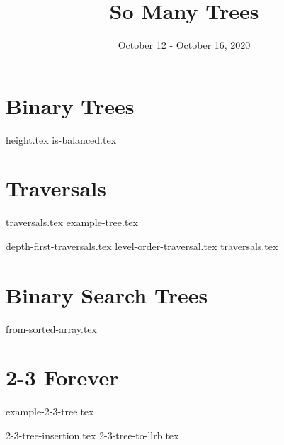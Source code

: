 \documentclass[11pt]{exam}
\title{So Many Trees}
\date{October 12 - October 16, 2020}
\begin{document}
\maketitle

\section{Binary Trees}
\begin{questions}
{height.tex}
{is-balanced.tex}
\end{questions}
\clearpage

\section{Traversals}
{traversals.tex}
{example-tree.tex}
\begin{questions}
{depth-first-traversals.tex}
{level-order-traversal.tex}
\enlargethispage{2in}
{traversals.tex}
\end{questions}
\clearpage

\section{Binary Search Trees}
\begin{questions}
{from-sorted-array.tex}
\end{questions}
\clearpage

\section{2-3 Forever}
{example-2-3-tree.tex}
\begin{questions}
{2-3-tree-insertion.tex}
{2-3-tree-to-llrb.tex}
\end{questions}
\end{document}
